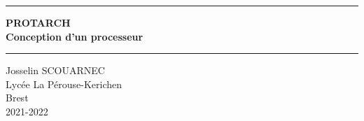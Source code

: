 \begin{titlepage}

	\centering
	\vspace*{15em}


    \rule[0pt]{\textwidth}{2pt}

    \textbf{\Huge{PROTARCH \\ \bigskip Conception d'un processeur}}

    \rule[0pt]{\textwidth}{2pt}



    \vspace{2em}
    \LARGE{Josselin SCOUARNEC} \\
    \vspace{2em}
    \LARGE{Lycée La Pérouse-Kerichen} \\
    \LARGE{Brest} \\
    \vspace{2em}
    \LARGE{2021-2022}



\end{titlepage}